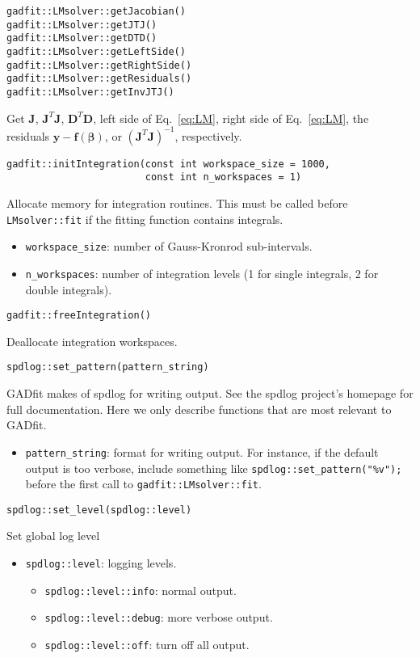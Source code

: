 \documentclass{article}
\begin{document}
\begin{verbatim}
gadfit::LMsolver::getJacobian()
gadfit::LMsolver::getJTJ()
gadfit::LMsolver::getDTD()
gadfit::LMsolver::getLeftSide()
gadfit::LMsolver::getRightSide()
gadfit::LMsolver::getResiduals()
gadfit::LMsolver::getInvJTJ()
\end{verbatim}
Get $\bm J$, $\bm J^T\bm J$, $\bm D^T\bm D$, left side of Eq.~\eqref{eq:LM}, right side of Eq.~\eqref{eq:LM}, the residuals $\bm y - \bm f(\bm \beta)$, or $(\bm J^T\bm J)^{-1}$, respectively.

\begin{verbatim}
gadfit::initIntegration(const int workspace_size = 1000,
                        const int n_workspaces = 1)
\end{verbatim}
Allocate memory for integration routines. This must be called before \verb+LMsolver::fit+ if the fitting function contains integrals.
\begin{itemize}
\item \verb+workspace_size+: number of Gauss-Kronrod sub-intervals.
\item \verb+n_workspaces+: number of integration levels (1 for single integrals, 2 for double integrals).
\end{itemize}

\begin{verbatim}
gadfit::freeIntegration()
\end{verbatim}
Deallocate integration workspaces.

\begin{verbatim}
spdlog::set_pattern(pattern_string)
\end{verbatim}
GADfit makes of spdlog for writing output. See the spdlog project's homepage for full documentation. Here we only describe functions that are most relevant to GADfit.
\begin{itemize}
\item \verb+pattern_string+: format for writing output. For instance, if the default output is too verbose, include something like \verb+spdlog::set_pattern("%v");+ before the first call to \verb+gadfit::LMsolver::fit+.
\end{itemize}

\begin{verbatim}
spdlog::set_level(spdlog::level)
\end{verbatim}
Set global log level
\begin{itemize}
\item \verb+spdlog::level+: logging levels.
  \begin{itemize}
  \item \verb+spdlog::level::info+: normal output.
  \item \verb+spdlog::level::debug+: more verbose output.
  \item \verb+spdlog::level::off+: turn off all output.
  \end{itemize}
\end{itemize}
\end{document}
